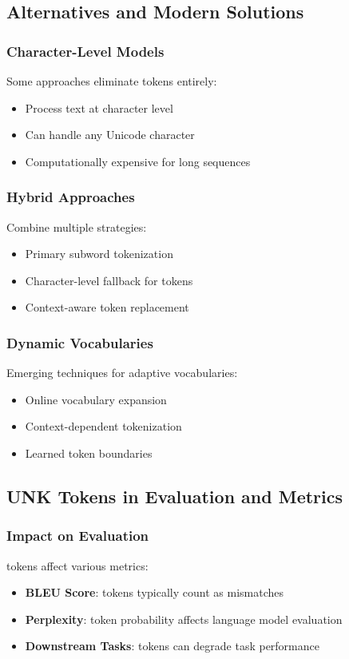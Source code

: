 \subsection{Alternatives and Modern Solutions}

\subsubsection{Character-Level Models}
Some approaches eliminate \unk{} tokens entirely:
\begin{itemize}
\item Process text at character level
\item Can handle any Unicode character
\item Computationally expensive for long sequences
\end{itemize}

\subsubsection{Hybrid Approaches}
Combine multiple strategies:
\begin{itemize}
\item Primary subword tokenization
\item Character-level fallback for \unk{} tokens
\item Context-aware token replacement
\end{itemize}

\subsubsection{Dynamic Vocabularies}
Emerging techniques for adaptive vocabularies:
\begin{itemize}
\item Online vocabulary expansion
\item Context-dependent tokenization
\item Learned token boundaries
\end{itemize}

\subsection{UNK Tokens in Evaluation and Metrics}

\subsubsection{Impact on Evaluation}
\unk{} tokens affect various metrics:
\begin{itemize}
\item \textbf{BLEU Score}: \unk{} tokens typically count as mismatches
\item \textbf{Perplexity}: \unk{} token probability affects language model evaluation
\item \textbf{Downstream Tasks}: \unk{} tokens can degrade task performance
\end{itemize}

